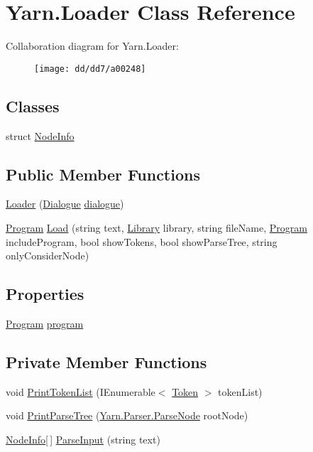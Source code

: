 \hypertarget{a00051}{\section{Yarn.\-Loader Class Reference}
\label{a00051}
}


Collaboration diagram for Yarn.\-Loader\-:
\nopagebreak
\begin{figure}[H]
\begin{center}
\leavevmode
\texttt{[image: dd/dd7/a00248]}
\end{center}
\end{figure}
\subsection*{Classes}
\begin{DoxyCompactItemize}
\item 
struct \hyperlink{a00056}{Node\-Info}
\end{DoxyCompactItemize}
\subsection*{Public Member Functions}
\begin{DoxyCompactItemize}
\item 
\hyperlink{a00051_a1972fc413e1679ecbe91eef536ca8479}{Loader} (\hyperlink{a00036}{Dialogue} \hyperlink{a00051_a89d1f29eba1c52c96c62a4cfe7859a1d}{dialogue})
\item 
\hyperlink{a00067}{Program} \hyperlink{a00051_ab6044e0d99dd4e6961ae7daaf1532c99}{Load} (string text, \hyperlink{a00049}{Library} library, string file\-Name, \hyperlink{a00067}{Program} include\-Program, bool show\-Tokens, bool show\-Parse\-Tree, string only\-Consider\-Node)
\end{DoxyCompactItemize}
\subsection*{Properties}
\begin{DoxyCompactItemize}
\item 
\hyperlink{a00067}{Program} \hyperlink{a00051_a6d8296076823c0c082df9024367f4860}{program}
\end{DoxyCompactItemize}
\subsection*{Private Member Functions}
\begin{DoxyCompactItemize}
\item 
void \hyperlink{a00051_a9321fce224021841ce6f70ca7fbe531b}{Print\-Token\-List} (I\-Enumerable$<$ \hyperlink{a00079}{Token} $>$ token\-List)
\item 
void \hyperlink{a00051_aa105ea8e5d65a420d1089616523feecc}{Print\-Parse\-Tree} (\hyperlink{a00063}{Yarn.\-Parser.\-Parse\-Node} root\-Node)
\item 
\hyperlink{a00056}{Node\-Info}\mbox{[}$\,$\mbox{]} \hyperlink{a00051_a2f635405d2b624ac67a27da0787a3524}{Parse\-Input} (string text)
\end{DoxyCompactItemize}
